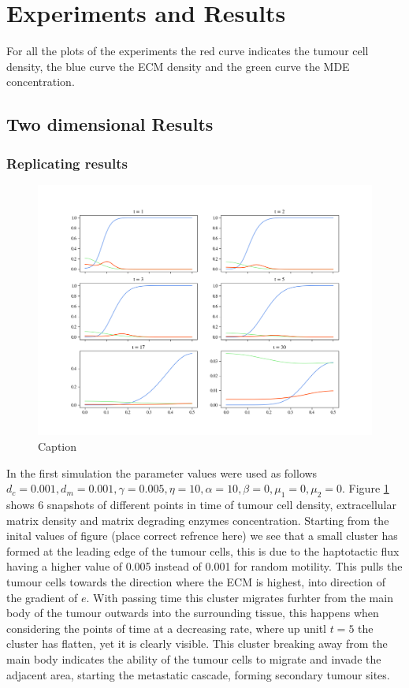 \section{Experiments and Results}
For all the plots of the experiments the red curve indicates the tumour cell density, the blue curve the ECM density and the green curve the MDE concentration. 
\subsection{Two dimensional Results}
\subsubsection{Replicating results}


\begin{figure}[h]
    \centering
    \includegraphics[width=\textwidth]{resources/images/0.001_0.001_0.001_10_0.1_0_0.005_0_0.png}
    \caption{Caption}
    \label{fig:0.001_0.001_0.001_10_0.1_0_0.005_0_0}
\end{figure}
In the first simulation the parameter values were used as follows $d_c = 0.001, d_m = 0.001, \gamma = 0.005, \eta = 10, \alpha = 10, \beta = 0, \mu_1 = 0, \mu_2 = 0$. Figure \ref{fig:0.001_0.001_0.001_10_0.1_0_0.005_0_0} shows 6 snapshots of different points in time of tumour cell density, extracellular matrix density and matrix degrading enzymes concentration. Starting from the inital values of figure (place correct refrence here) we see that a small cluster has formed at the leading edge of the tumour cells, this is due to the haptotactic flux having a higher value of 0.005 instead of 0.001 for random motility. This pulls the tumour cells towards the direction where the ECM is highest, into direction of the gradient of $e$. With passing time this cluster migrates furhter from the main body of the tumour outwards into the surrounding tissue, this happens when considering the points of time at a decreasing rate, where up unitl $t = 5$ the cluster has flatten, yet it is clearly visible. This cluster breaking away from the main body indicates the ability of the tumour cells to migrate and invade the adjacent area, starting the metastatic cascade, forming secondary tumour sites. 

